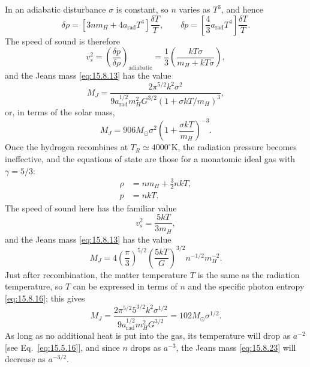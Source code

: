 In an adiabatic disturbance \(\sigma\) is constant, so \(n\) varies as
\(T^3\), and hence
\[
  \delta\rho
  =
  [3nm_H+4a_{\mathrm{rad}}T^4]\frac{\delta T}{T},
  \qquad
  \delta p
  =
  \left[\frac43a_{\mathrm{rad}}T^4\right]\frac{\delta T}{T}.
\]
The speed of sound is therefore
\begin{equation}
  v_s^2
  =
  \left(\frac{\delta p}{\delta\rho}\right)_{\mathrm{adiabatic}}
  =
  \frac13
  \left(
    \frac{kT\sigma}{m_H+kT\sigma}
  \right),
  \tag{15.8.17}\label{eq:15.8.17}
\end{equation}
and the Jeans mass \eqref{eq:15.8.13} has the value
\begin{equation}
  M_J
  =
  \frac{
    2\pi^{5/2}k^2\sigma^2
  }{
    9a_{\mathrm{rad}}^{1/2}m_H^2G^{3/2}
    (1+\sigma kT/m_H)^3
  },
  \tag{15.8.18}\label{eq:15.8.18}
\end{equation}
or, in terms of the solar mass,
\begin{equation}
  M_J
  =
  906M_\odot\sigma^2
  \left(
    1+\frac{\sigma kT}{m_H}
  \right)^{-3}.
  \tag{15.8.19}\label{eq:15.8.19}
\end{equation}
Once the hydrogen recombines at \(T_R\simeq4000^\circ\mathrm K\), the
radiation pressure becomes ineffective, and the equations of state are those
for a monatomic ideal gas with \(\gamma=5/3\):
\begin{align}
  \rho
  &=
  nm_H+\frac32nkT,
  \tag{15.8.20}\label{eq:15.8.20}\\
  p
  &=
  nkT.
  \tag{15.8.21}\label{eq:15.8.21}
\end{align}
The speed of sound here has the familiar value
\begin{equation}
  v_s^2=\frac{5kT}{3m_H},
  \tag{15.8.22}\label{eq:15.8.22}
\end{equation}
and the Jeans mass \eqref{eq:15.8.13} has the value
\begin{equation}
  M_J
  =
  4\left(\frac{\pi}{3}\right)^{5/2}
  \left(\frac{5kT}{G}\right)^{3/2}
  n^{-1/2}m_H^{-2}.
  \tag{15.8.23}\label{eq:15.8.23}
\end{equation}
Just after recombination, the matter temperature \(T\) is the same as the
radiation temperature, so \(T\) can be expressed in terms of \(n\) and the
specific photon entropy \eqref{eq:15.8.16}; this gives
\begin{equation}
  M_J
  =
  \frac{
    2\pi^{5/2}5^{3/2}k^2\sigma^{1/2}
  }{
    9a_{\mathrm{rad}}^{1/2}m_H^2G^{3/2}
  }
  =
  102M_\odot\sigma^{1/2}.
  \tag{15.8.24}\label{eq:15.8.24}
\end{equation}
As long as no additional heat is put into the gas, its temperature will drop
as \(a^{-2}\) [see Eq.~\eqref{eq:15.5.16}], and since \(n\) drops as
\(a^{-3}\), the Jeans mass \eqref{eq:15.8.23} will decrease as
\(a^{-3/2}\).

